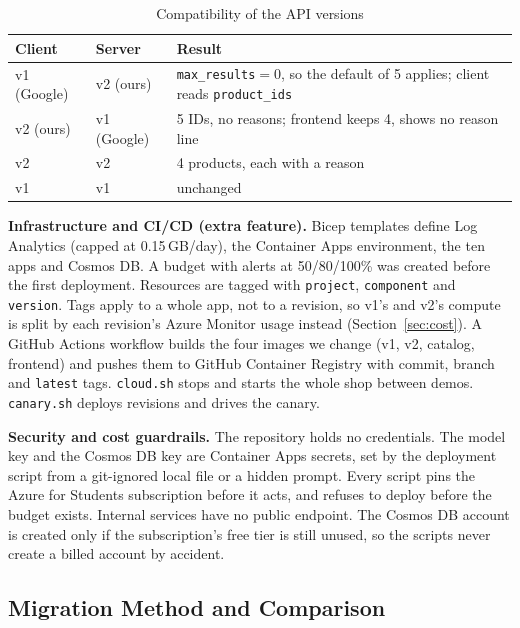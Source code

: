 \documentclass[conference]{IEEEtran}
\begin{document}
\begin{table}[t]
\caption{Compatibility of the API versions}
\label{tab:compat}
\centering\small
\begin{tabularx}{\columnwidth}{@{}llY@{}}
\toprule
Client & Server & Result \\
\midrule
v1 (Google) & v2 (ours) & \texttt{max\_results}${}=0$, so the default of 5 applies; client reads \texttt{product\_ids} \\
v2 (ours) & v1 (Google) & 5 IDs, no reasons; frontend keeps 4, shows no reason line \\
v2 & v2 & 4 products, each with a reason \\
v1 & v1 & unchanged \\
\bottomrule
\end{tabularx}
\end{table}

\textbf{Infrastructure and CI/CD (extra feature).} Bicep templates define
Log Analytics (capped at 0.15\,GB/day), the Container Apps environment, the
ten apps and Cosmos DB. A budget with alerts at 50/80/100\% was created
before the first deployment. Resources are tagged with \texttt{project},
\texttt{component} and \texttt{version}. Tags apply to a whole app, not to a
revision, so v1's and v2's compute is split by each revision's Azure Monitor
usage instead (Section~\ref{sec:cost}). A GitHub Actions workflow builds
the four images we change (v1, v2, catalog, frontend) and pushes them to
GitHub Container Registry with commit, branch and \texttt{latest} tags.
\texttt{cloud.sh} stops and starts the whole shop between demos.
\texttt{canary.sh} deploys revisions and drives the canary.

\textbf{Security and cost guardrails.} The repository holds no
credentials. The model key and the Cosmos DB key are Container Apps secrets,
set by the deployment script from a git-ignored local file or a hidden
prompt. Every script pins the Azure for Students subscription before it
acts, and refuses to deploy before the budget exists. Internal services have
no public endpoint. The Cosmos DB account is created only if the
subscription's free tier is still unused, so the scripts never create a
billed account by accident.

\subsection{Migration Method and Comparison}
\end{document}
